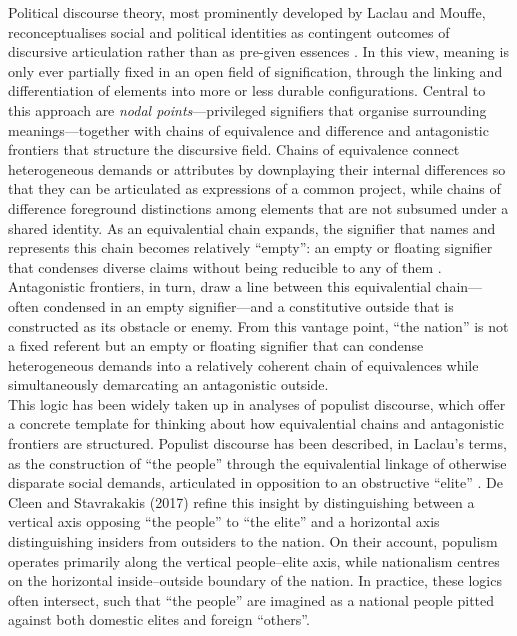 \documentclass[man,12pt]{apa7}
\begin{document}
Political discourse theory, most prominently developed by Laclau and Mouffe, reconceptualises social and political identities as contingent outcomes of discursive articulation rather than as pre-given essences \parencite{laclau1985}. 
In this view, meaning is only ever partially fixed in an open field of signification, through the linking and differentiation of elements into more or less durable configurations. 
Central to this approach are \emph{nodal points}—privileged signifiers that organise surrounding meanings—together with chains of equivalence and difference and antagonistic frontiers that structure the discursive field. 
Chains of equivalence connect heterogeneous demands or attributes by downplaying their internal differences so that they can be articulated as expressions of a common project, 
while chains of difference foreground distinctions among elements that are not subsumed under a shared identity. 
As an equivalential chain expands, the signifier that names and represents this chain becomes relatively ``empty'': an empty or floating signifier that condenses diverse claims without being reducible to any of them \parencite{laclau2005}. 
Antagonistic frontiers, in turn, draw a line between this equivalential chain—often condensed in an empty signifier—and a constitutive outside that is constructed as its obstacle or enemy. 
From this vantage point, ``the nation'' is not a fixed referent but an empty or floating signifier that can condense heterogeneous demands into a relatively coherent chain of equivalences 
while simultaneously demarcating an antagonistic outside.\\%
This logic has been widely taken up in analyses of populist discourse, which offer a concrete template for thinking about how equivalential chains and antagonistic frontiers are structured. 
Populist discourse has been described, in Laclau's terms, as the construction of ``the people'' through the equivalential linkage of otherwise disparate social demands, articulated in opposition to an obstructive ``elite'' \parencite{laclau2005,hatakka2019}. 
De Cleen and Stavrakakis (2017) refine this insight by distinguishing between a vertical axis opposing ``the people'' to ``the elite'' and a horizontal axis distinguishing insiders from outsiders to the nation. 
On their account, populism operates primarily along the vertical people–elite axis, while nationalism centres on the horizontal inside–outside boundary of the nation. 
In practice, these logics often intersect, such that ``the people'' are imagined as a national people pitted against both domestic elites and foreign ``others''. 
\end{document}
